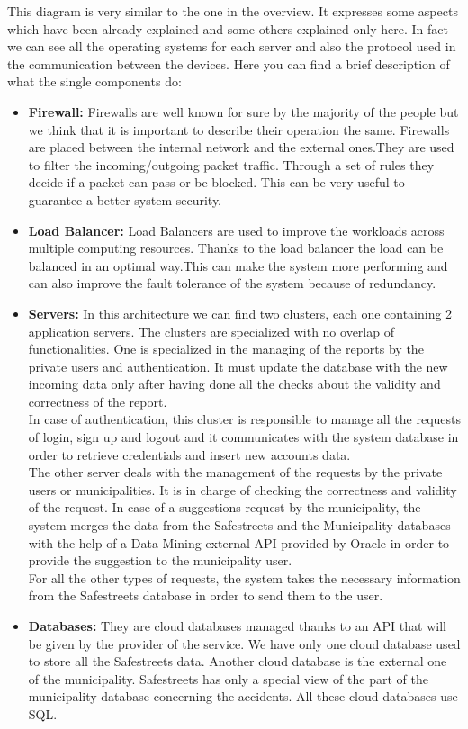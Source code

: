 \documentclass[titlepage]{article}
\begin{document}
This diagram is very similar to the one in the overview. It expresses some aspects which have been already explained and some others explained only here. In fact we can see all the operating systems for each server and also the protocol used in the communication between the devices.
Here you can find a brief description of what the single components do:
\begin{itemize}
\item \textbf{Firewall:} Firewalls are well known for sure by the majority of the people but we think that it is important to describe their operation the same. Firewalls are placed between the internal network and the external ones.They are used to filter the incoming/outgoing packet traffic. Through a set of rules they decide if a packet can pass or be blocked.  This can be very useful to guarantee a better system security.
\item \textbf{Load Balancer:} Load Balancers are used to improve the workloads across multiple computing resources. Thanks to the load balancer the load can be balanced in an optimal way.This can make the system more performing and can also improve the fault tolerance of the system because of redundancy.
\item \textbf{Servers:} In this architecture we can find two clusters, each one containing 2 application servers. The clusters are specialized with no overlap of functionalities. One is specialized in the managing of the reports by the private users and authentication. It must update the database with the new incoming data only after having done all the checks about the validity and correctness of the report.\\
In case of authentication, this cluster is responsible to manage all the requests of login, sign up and logout and it communicates with the system database in order to retrieve credentials and insert new accounts data.\\
The other server deals with the management of the requests by the private users or municipalities. It is in charge of checking the correctness and validity of the request. In case of a suggestions request by the municipality, the system merges the data from the Safestreets and the Municipality databases with the help of a Data Mining external API provided by Oracle in order to provide the suggestion to the municipality user.\\
For all the other types of requests, the system takes the necessary information from the Safestreets database in order to send them to the user.\\
\item \textbf{Databases:} They are cloud databases managed thanks to an API that will be given by the provider of the service. We have only one cloud database used to store all the Safestreets data. Another cloud database is the external one of the municipality. Safestreets has only a special view of the part of the municipality database concerning the accidents. All these cloud databases use SQL.
\end{itemize}
\newpage
\end{document}
